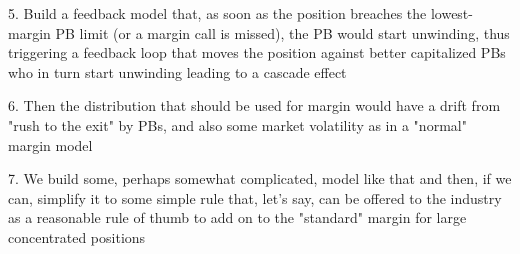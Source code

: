\documentclass{article}
\begin{document}
\TEXTsymbol{>} 5. Build a feedback model that, as soon as the position
breaches the lowest-margin PB limit (or a margin call is missed), the PB
would start unwinding, thus triggering a feedback loop that moves the
position against better capitalized PBs who in turn start unwinding leading
to a cascade effect

\TEXTsymbol{>} 6. Then the distribution that should be used for margin would
have a drift from "rush to the exit" by PBs, and also some market volatility
as in a "normal" margin model

\TEXTsymbol{>} 7. We build some, perhaps somewhat complicated, model like
that and then, if we can, simplify it to some simple rule that, let's say,
can be offered to the industry as a reasonable rule of thumb to add on to
the "standard" margin for large concentrated positions
\end{document}
